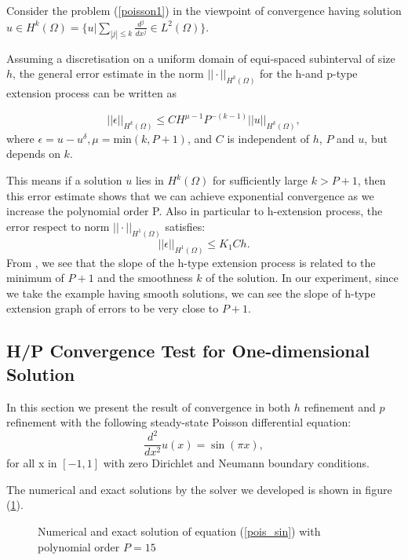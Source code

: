 
Consider the problem (\ref{poisson1}) in the viewpoint of convergence having solution $u \in H^k(\Omega)= \{u|\sum_{|j|\le k }\frac{d^j}{dx^j} \in L^2(\Omega) \}$.

Assuming a discretisation on a uniform domain of equi-spaced subinterval of size $h$, the general error estimate in the norm $||\cdot||_{H^k(\Omega)}$ for the h-and p-type extension process can be written as \cite{Karniadarkis}

\begin{equation}
\label{hprelation}
||\epsilon||_{H^k(\Omega)} \le CH^{\mu-1}P^{-(k-1)}||u||_{H^k(\Omega)},
\end{equation}
where $\epsilon = u - u^{\delta}, \mu = \mbox{min}(k, P+1)$, and $C$ is independent of $h$, $P$ and $u$, but depends on $k$.

This means if a solution $u$ lies in  $H^k(\Omega)$ for sufficiently large $k > P+1$, then this error estimate shows that we can achieve exponential convergence as we increase the polynomial order P. Also in particular to h-extension process, the error respect to norm $||\cdot||_{H^1(\Omega)}$ satisfies:
\begin{equation}
\label{hrelation} ||\epsilon||_{H^1(\Omega)} \le K_1Ch.
\end{equation}
From \cite{Karniadarkis}, we see that the slope of the h-type extension process is related to the minimum of $P+1$ and the smoothness $k$ of the solution. In our experiment, since we take the example having smooth solutions, we can see the slope of h-type extension graph of errors to be very close to $P+1$.

\subsection {H/P Convergence Test for One-dimensional Solution}

In this section we present the result of convergence in both $h$ refinement and $p$ refinement with the following steady-state Poisson differential equation:
\begin{equation}
\label{pois_sin}
\frac{d^2}{dx^2} u(x) = \sin(\pi x),
\end{equation}
for all x in $[-1, 1]$ with zero Dirichlet and Neumann boundary
conditions.

The numerical and exact solutions by the solver we developed is shown in figure (\ref{sinsol}).

\begin{figure}[h]
    \begin{center}
    \caption{\label{sinsol}Numerical and exact solution of equation (\ref{pois_sin}) with polynomial order $P=15$}
    \end{center}
\end{figure}

